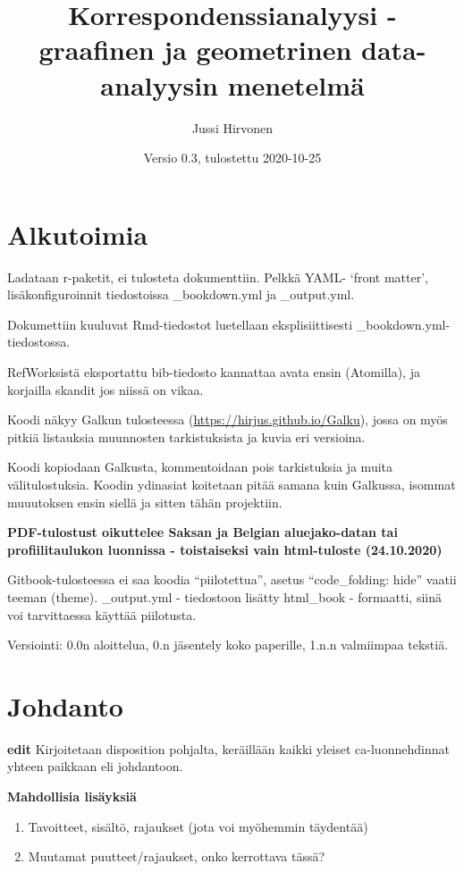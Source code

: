 \documentclass[
  finnish,
]{book}
\title{Korrespondenssianalyysi - graafinen ja geometrinen data-analyysin
menetelmä}
\author{Jussi Hirvonen}
\date{Versio 0.3, tulostettu 2020-10-25}
\begin{document}
\frontmatter
\maketitle

\mainmatter
\hypertarget{alkutoimia}{%
\chapter*{Alkutoimia}\label{alkutoimia}}

Ladataan r-paketit, ei tulosteta dokumenttiin. Pelkkä YAML- `front
matter', lisäkonfiguroinnit tiedostoissa \_bookdown.yml ja \_output.yml.

Dokumettiin kuuluvat Rmd-tiedostot luetellaan eksplisiittisesti
\_bookdown.yml-tiedostossa.

RefWorksistä eksportattu bib-tiedosto kannattaa avata ensin (Atomilla),
ja korjailla skandit jos niissä on vikaa.

Koodi näkyy Galkun tulosteessa (\url{https://hirjus.github.io/Galku}),
jossa on myös pitkiä listauksia muunnosten tarkistuksista ja kuvia eri
versioina.

Koodi kopiodaan Galkusta, kommentoidaan pois tarkistuksia ja muita
välitulostuksia. Koodin ydinasiat koitetaan pitää samana kuin Galkussa,
isommat muuutoksen ensin siellä ja sitten tähän projektiin.

\textbf{PDF-tulostust oikuttelee Saksan ja Belgian aluejako-datan tai
profiilitaulukon luonnissa - toistaiseksi vain html-tuloste
(24.10.2020)}

Gitbook-tulosteessa ei saa koodia ``piilotettua'', asetus
``code\_folding: hide'' vaatii teeman (theme). \_output.yml - tiedostoon
lisätty html\_book - formaatti, siinä voi tarvittaessa käyttää
piilotusta.

Versiointi: 0.0n aloittelua, 0.n jäsentely koko paperille, 1.n.n
valmiimpaa tekstiä.

\hypertarget{johdanto}{%
\chapter{Johdanto}\label{johdanto}}

\textbf{edit} Kirjoitetaan disposition pohjalta, keräillään kaikki
yleiset ca-luonnehdinnat yhteen paikkaan eli johdantoon.

\textbf{Mahdollisia lisäyksiä}

\begin{enumerate}
\def\labelenumi{\arabic{enumi}.}
\item
  Tavoitteet, sisältö, rajaukset (jota voi myöhemmin täydentää)
\item
  Muutamat puutteet/rajaukset, onko kerrottava tässä?
\end{enumerate}
\end{document}
